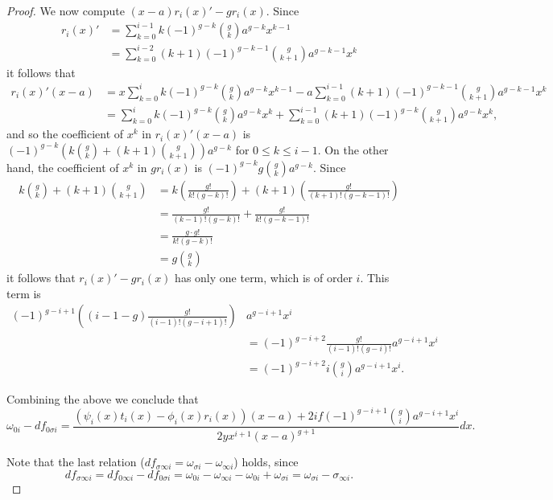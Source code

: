 \documentclass[draft, 11pt]{article} %
\theoremstyle{plain}
\theoremstyle{remark}
\begin{document}
\begin{proof}
We now compute $(x-a)r_i(x)'-gr_i(x)$.
Since 
\begin{align*}
r_i(x)' & = \sum_{k=0}^{i-1} k (-1)^{g-k} \binom{g}{k} a^{g-k} x^{k-1} \\
& = \sum_{k=0}^{i-2} (k+1) (-1)^{g-k-1} \binom{g}{k+1}a^{g-k-1} x^k
\end{align*}
it follows that
\begin{align*}
r_i(x)'(x-a) & = x \sum_{k=0}^i k (-1)^{g-k} \binom{g}{k} a^{g-k} x^{k-1} - a \sum_{k=0}^{i-1} (k+1) (-1)^{g-k-1} \binom{g}{k+1}a^{g-k-1} x^k \\
& = \sum_{k=0}^i k (-1)^{g-k} \binom{g}{k} a^{g-k} x^k  + \sum_{k=0}^{i-1} (k+1) (-1)^{g-k} \binom{g}{k+1}a^{g-k} x^k,
\end{align*}
and so the coefficient of $x^k$ in $r_i(x)'(x-a)$ is $(-1)^{g-k}\left(k\binom{g}{k} + (k+1)\binom{g}{k+1}\right) a^{g-k}$ for $0 \leq k \leq i-1$.
On the other hand, the coefficient of $x^k$ in $gr_i(x)$ is $(-1)^{g-k}g\binom{g}{k}a^{g-k}$.
Since 
\begin{align*}
k\binom{g}{k} + (k+1)\binom{g}{k+1} & = k \left( \frac{g!}{k!(g-k)!} \right) + (k+1) \left( \frac{g!}{(k+1)!(g-k-1)!} \right) \\
& = \frac{g!}{(k-1)!(g-k)!} + \frac{g!}{k!(g-k-1)!} \\
& = \frac{g\cdot g!}{k!(g-k)!} \\
& = g \binom{g}{k}
\end{align*}
it follows that $r_i(x)'-gr_i(x)$ has only one term, which is of order $i$.
This term is
\begin{align*}
 (-1)^{g-i+1}\left( (i-1-g)\frac{g!}{(i-1)!(g-i+1)!} \right) & a^{g-i+1}x^i \\
&  = (-1)^{g-i+2} \frac{g!}{(i-1)!(g-i)!} a^{g-i+1}x^i \\
& = (-1)^{g-i+2}i\binom{g}{i} a^{g-i+1}x^i.
\end{align*}

Combining the above we conclude that
\[
\omega_{0 i } - df_{0\sigma i} =  \frac{(\psi_i(x)t_i(x) - \phi_i(x)r_i(x))(x-a) + 2if(-1)^{g-i+1}\binom{g}{i} a^{g-i+1}x^i}{2yx^{i+1}(x-a)^{g+1}}dx.
\]

Note that the last relation ($df_{\sigma \infty i} = \omega_{\sigma i} - \omega_{\infty i}$) holds, since 
\[
df_{\sigma \infty i} = df_{0 \infty i} - df_{0 \sigma i} = \omega_{0 i} - \omega_{\infty i } - \omega_{0 i} + \omega_{\sigma i} = \omega_{\sigma i} - \sigma_{\infty i}.
\]
\end{proof}
\end{document}
